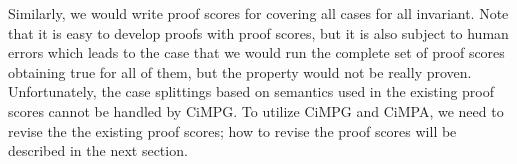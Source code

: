 \documentclass[a4paper,fleqn]{cas-dc}
\begin{document}
Similarly, we would write proof scores for covering all cases for all invariant. Note that it is easy to develop proofs with proof scores, but it is also subject to human errors which leads to the case that we would run the complete set of proof scores obtaining true for all of them, but the property would not be really proven.  Unfortunately, the case splittings based on semantics used in the existing proof scores cannot be handled by CiMPG. To utilize CiMPG and CiMPA, we need to revise the the existing proof scores; how to revise the proof scores will be described in the next section.


\end{document}
